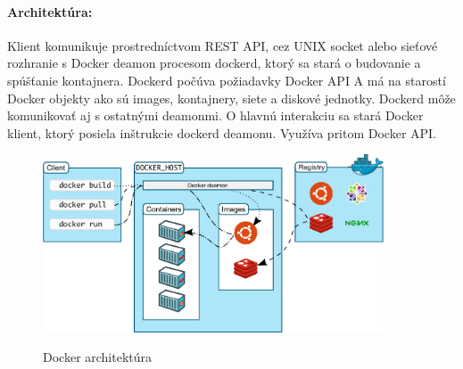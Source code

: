\documentclass[../../main.tex]{subfiles}
\begin{document}
 \paragraph{Architektúra:}
 Klient komunikuje prostredníctvom REST API, cez UNIX socket alebo sieťové rozhranie s Docker deamon procesom dockerd, ktorý sa stará o budovanie a spúšťanie kontajnera. Dockerd počúva požiadavky Docker API A má na starostí Docker objekty ako sú images, kontajnery, siete a diskové jednotky. Dockerd môže komunikovať aj s ostatnými deamonmi. O hlavnú interakciu sa stará Docker klient, ktorý posiela inštrukcie dockerd deamonu. Využíva pritom Docker API.
 \begin{figure}[h!]
     \centering
     \includegraphics[width =0.9\textwidth]{images/docker_architecture.png}
     \caption{Docker architektúra\cite{docker_overview}}
     \label{fig:docker_architecture}\cite{docker_overview}
 \end{figure}
\end{document}
